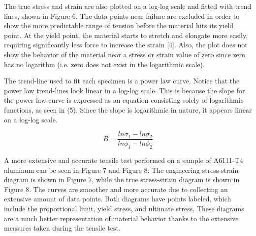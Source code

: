 \documentclass[12pt]{article}
\begin{document}
\newpage



\newpage

The true stress and strain are also plotted on a log-log scale and fitted with trend lines, shown in Figure 6. The data points near failure are excluded in order to show the more predictable range of tension before the material hits its yield point. At the yield point, the material starts to stretch and elongate more easily, requiring significantly less force to increase the strain [4]. Also, the plot does not show the behavior of the material near a stress or strain value of zero since zero has no logarithm (i.e. zero does not exist in the logarithmic scale). 
\bigskip

The trend-line used to fit each specimen is a power law curve. Notice that the power law trend-lines look linear in a log-log scale. This is because the slope for the power law curve is expressed as an equation consisting solely of logarithmic functions, as seen in (5). Since the slope is logarithmic in nature, it appears linear on a log-log scale. 
\bigskip

\begin{equation}
B = \frac{ln\sigma_{1}-ln\sigma_{2}}{ln\phi_{1}-ln\phi_{2}}
\end{equation}

\bigskip
\bigskip
\bigskip


\newpage

A more extensive and accurate tensile test performed on a sample of A6111-T4 aluminum can be seen in Figure 7 and Figure 8. The engineering stress-strain diagram is shown in Figure 7, while the true stress-strain diagram is shown in Figure 8. The curves are smoother and more accurate due to collecting an extensive amount of data points. Both diagrams have points labeled, which include the proportional limit, yield stress, and ultimate stress. These diagrams are a much better representation of material behavior thanks to the extensive measures taken during the tensile test.
\end{document}
